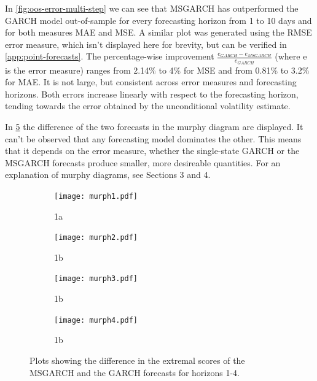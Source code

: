 \documentclass[11pt,a4paper]{article}
\begin{document}
In \cref{fig:oos-error-multi-step} we can see that MSGARCH has outperformed the GARCH model out-of-sample for every forecasting horizon from 1 to 10 days and for both measures MAE and MSE. 
A similar plot was generated using the RMSE error measure, which isn't displayed here for brevity, but can be verified in \cref{app:point-forecasts}. 
The percentage-wise improvement $\frac{e_{GARCH}-e_{MSGARCH}}{e_{GARCH}}$ (where e is the error measure) ranges from 2.14\% to 4\% for MSE and from 0.81\% to 3.2\% for MAE. It is not large, but consistent across error measures and forecasting horizons.
Both errors increase linearly with respect to the forecasting horizon, tending towards the error obtained by the unconditional volatility estimate.



In \cref{fig:murphy-diagrams} the difference of the two forecasts in the murphy diagram are displayed. It can't be observed that any forecasting model dominates the other. This means that it depends on the error measure, whether the single-state GARCH or the MSGARCH forecasts produce smaller, more desireable quantities.
For an explanation of murphy diagrams, see \cite{ehm_quantiles_2016} Sections 3 and 4.

\begin{figure}[H]
	\begin{subfigure}{.5\textwidth}
		\centering
		\texttt{[image: murph1.pdf]}
		\caption{1a}
		\label{fig:sfig1}
	\end{subfigure}%
	\begin{subfigure}{.5\textwidth}
		\centering
		\texttt{[image: murph2.pdf]}
		\caption{1b}
		\label{fig:sfig2}
	\end{subfigure}
	\begin{subfigure}{.5\textwidth}
	\centering
	\texttt{[image: murph3.pdf]}
	\caption{1b}
	\label{fig:sfig2}
\end{subfigure}
	\begin{subfigure}{.5\textwidth}
	\centering
	\texttt{[image: murph4.pdf]}
	\caption{1b}
	\label{fig:sfig2}
\end{subfigure}
	\caption{Plots showing the difference in the extremal scores of the MSGARCH and the GARCH forecasts for horizons 1-4.}
	\label{fig:murphy-diagrams}
\end{figure}



\end{document}
